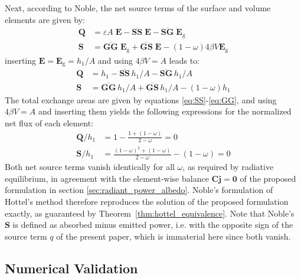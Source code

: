 \documentclass[preprint,1p,times]{elsarticle}
\theoremstyle{plain}
\theoremstyle{definition}
\theoremstyle{remark}
\begin{document}
Next, according to Noble, the net source terms of the surface and volume elements are given by:
\begin{equation}
\begin{split}
	\mathbf{Q} &= \varepsilon A\; \mathbf{E}-\overline{\mathbf{SS}}\;\mathbf{E} -\overline{\mathbf{SG}}\;\mathbf{E}_\mathrm{g} \\
	\mathbf{S} &= \overline{\mathbf{GG}}\; \mathbf{E}_\mathrm{g} +\overline{\mathbf{GS}}\; \mathbf{E} -(1-\omega)4\beta V \mathbf{E}_\mathrm{g}
\end{split}
\end{equation}
inserting $\mathbf{E} = \mathbf{E}_\mathrm{g} = h_1/A$ and using $4\beta V = A$ leads to:
\begin{equation}
\begin{split}
	\mathbf{Q} &= h_1-\overline{\mathbf{SS}}\,h_1/A -\overline{\mathbf{SG}}\,h_1/A \\
	\mathbf{S} &= \overline{\mathbf{GG}}\,h_1/A +\overline{\mathbf{GS}}\,h_1/A -(1-\omega) h_1
\end{split}
\end{equation}
The total exchange areas are given by equations \eqref{eq:SS}-\eqref{eq:GG}, and using $4\beta V=A$ and inserting them yields the following expressions for the normalized net flux of each element:
\begin{equation}
\begin{split}
	\mathbf{Q}/h_1 &= 1 - \frac{1 + (1-\omega)}{2-\omega} = 0 \\
	\mathbf{S}/h_1 &= \frac{(1-\omega)^2 + (1-\omega)}{2-\omega} - (1-\omega) = 0
\end{split}
	\label{eq:hottel_agreement}
\end{equation}
Both net source terms vanish identically for all $\omega$, as required by radiative equilibrium, in agreement with the element-wise balance $\mathbf{C}\mathbf{j} = \mathbf{0}$ of the proposed formulation in section \ref{sec:radiant_power_albedo}. Noble's formulation of Hottel's method therefore reproduces the solution of the proposed formulation exactly, as guaranteed by Theorem~\ref{thm:hottel_equivalence}. Note that Noble's $\mathbf{S}$ is defined as absorbed minus emitted power, i.e. with the opposite sign of the source term $q$ of the present paper, which is immaterial here since both vanish.

\subsection{Numerical Validation}
\label{sec:numerical_validation}
\end{document}
